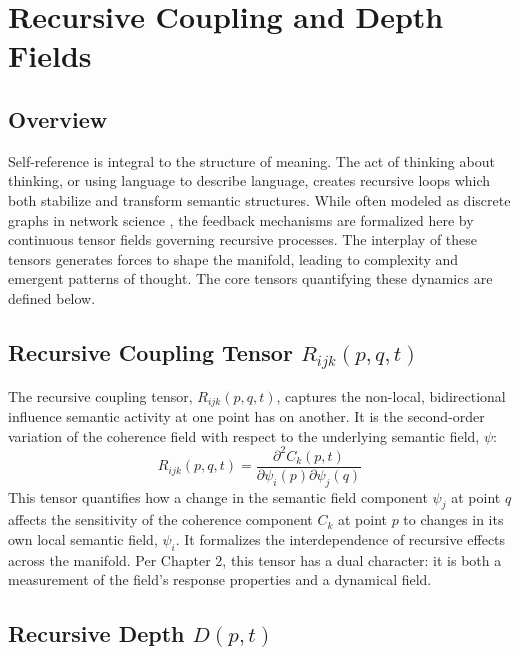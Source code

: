 \chapter{Recursive Coupling and Depth Fields}

\section{Overview}

Self-reference is integral to the structure of meaning. The act of thinking about thinking, or using language to describe language, creates recursive loops which both stabilize and transform semantic structures. While often modeled as discrete graphs in network science \autocite{Barabasi2016}, the feedback mechanisms are formalized here by continuous tensor fields governing recursive processes. The interplay of these tensors generates forces to shape the manifold, leading to complexity and emergent patterns of thought. The core tensors quantifying these dynamics are defined below.

\section{\texorpdfstring{Recursive Coupling Tensor $R_{ijk}(p, q, t)$}{Recursive Coupling Tensor R_ijk(p, q, t)}}

The recursive coupling tensor, \(R_{ijk}(p, q, t)\), captures the non-local, bidirectional influence semantic activity at one point has on another. It is the second-order variation of the coherence field with respect to the underlying semantic field, \(\psi\):
\begin{equation}
R_{ijk}(p, q, t) = \frac{\partial^2 C_k(p,t)}{\partial \psi_i(p) \partial \psi_j(q)}
\end{equation}
This tensor quantifies how a change in the semantic field component \(\psi_j\) at point \(q\) affects the sensitivity of the coherence component \(C_k\) at point \(p\) to changes in its own local semantic field, \(\psi_i\). It formalizes the interdependence of recursive effects across the manifold. Per Chapter 2, this tensor has a dual character: it is both a measurement of the field's response properties and a dynamical field.

\section{\texorpdfstring{Recursive Depth $D(p, t)$}{Recursive Depth D(p, t)}}

